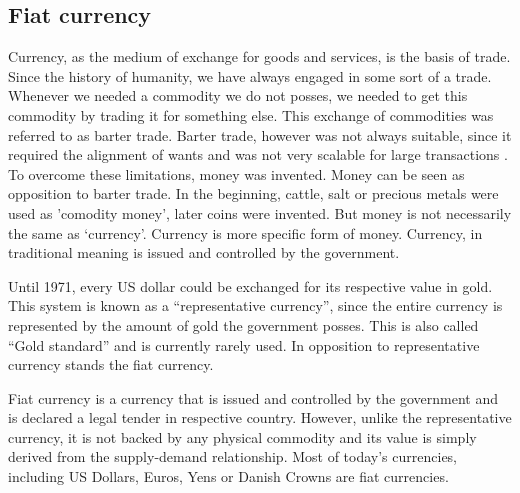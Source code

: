 \subsection{Fiat  currency}
% 
Currency, as the medium of exchange for goods and services, is the basis of trade. Since the history of humanity, we have always engaged in some sort of a trade. Whenever we needed a commodity we do not posses, we needed to get this commodity by trading it for something else. This exchange of commodities was referred to as barter trade. Barter trade, however was not always suitable, since it required the alignment of wants and was not very scalable for large transactions \cite{Carroll2015CreatingExchange}. To overcome these limitations, money was invented. Money can be seen as opposition to barter trade. In the beginning, cattle, salt or precious metals were used as 'comodity money', later coins were invented. But money is not necessarily the same as `currency'.  Currency is more specific form of money. Currency, in traditional meaning is issued and controlled by the government\footnotemark.
% 

Until 1971, every US dollar could be exchanged for its respective value in gold. This system is known as a ``representative currency'', since the entire currency is represented by the amount of gold the government posses. This is also called ``Gold standard'' and is currently rarely used. In opposition to representative currency stands the fiat currency. 

Fiat currency is a currency that is issued and controlled by the government and is declared a legal tender in respective country. However, unlike the representative currency, it is not backed by any physical commodity and its value is simply derived from the supply-demand relationship\footnotemark. Most of today's currencies, including US Dollars, Euros, Yens or Danish Crowns are fiat currencies.
% 
